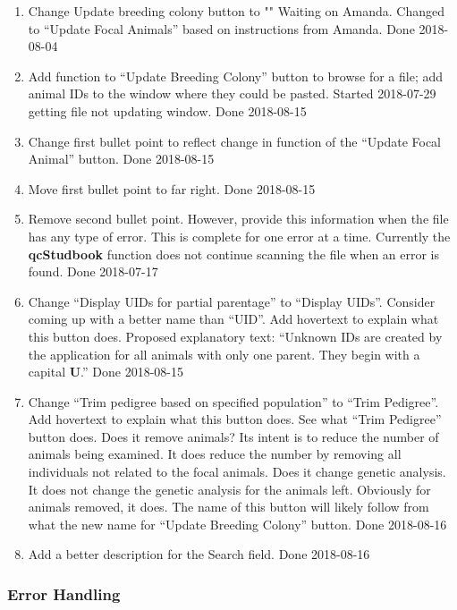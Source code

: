 \documentclass[
]{article}
\providecommand{\tightlist}{%
  \setlength{\itemsep}{0pt}\setlength{\parskip}{0pt}}
\begin{document}
\begin{enumerate}
\def\labelenumi{\arabic{enumi}.}
\tightlist
\item
  Change Update breeding colony button to "" Waiting on Amanda. Changed
  to ``Update Focal Animals'' based on instructions from Amanda. Done
  2018-08-04
\item
  Add function to ``Update Breeding Colony'' button to browse for a
  file; add animal IDs to the window where they could be pasted. Started
  2018-07-29 getting file not updating window. Done 2018-08-15
\item
  Change first bullet point to reflect change in function of the
  ``Update Focal Animal'' button. Done 2018-08-15
\item
  Move first bullet point to far right. Done 2018-08-15
\item
  Remove second bullet point. However, provide this information when the
  file has any type of error. This is complete for one error at a time.
  Currently the \textbf{qcStudbook} function does not continue scanning
  the file when an error is found. Done 2018-07-17
\item
  Change ``Display UIDs for partial parentage'' to ``Display UIDs''.
  Consider coming up with a better name than ``UID''. Add hovertext to
  explain what this button does. Proposed explanatory text: ``Unknown
  IDs are created by the application for all animals with only one
  parent. They begin with a capital \textbf{U}.'' Done 2018-08-15
\item
  Change ``Trim pedigree based on specified population'' to ``Trim
  Pedigree''. Add hovertext to explain what this button does. See what
  ``Trim Pedigree'' button does. Does it remove animals? Its intent is
  to reduce the number of animals being examined. It does reduce the
  number by removing all individuals not related to the focal animals.
  Does it change genetic analysis. It does not change the genetic
  analysis for the animals left. Obviously for animals removed, it does.
  The name of this button will likely follow from what the new name for
  ``Update Breeding Colony'' button. Done 2018-08-16
\item
  Add a better description for the Search field. Done 2018-08-16
\end{enumerate}

\hypertarget{error-handling}{%
\subsubsection{Error Handling}\label{error-handling}}
\end{document}
